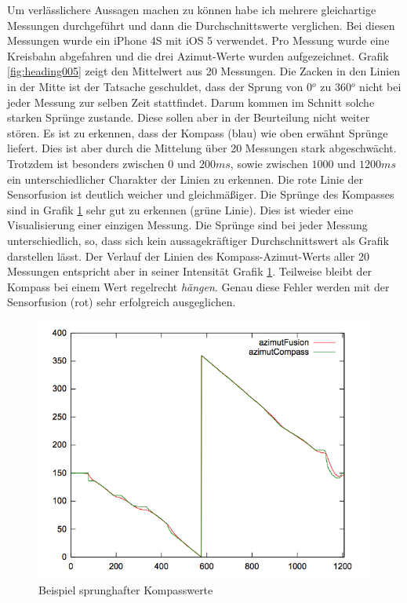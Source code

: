 Um verlässlichere Aussagen machen zu können habe ich mehrere gleichartige Messungen durchgeführt und dann die Durchschnittswerte verglichen. Bei diesen Messungen wurde ein iPhone 4S mit iOS 5 verwendet. Pro Messung wurde eine Kreisbahn abgefahren und die drei Azimut-Werte wurden aufgezeichnet. Grafik \ref{fig:heading005} zeigt den Mittelwert aus 20 Messungen. Die Zacken in den Linien in der Mitte ist der Tatsache geschuldet, dass der Sprung von 0$^o$ zu 360$^o$ nicht bei jeder Messung zur selben Zeit stattfindet. Darum kommen im Schnitt solche starken Sprünge zustande. Diese sollen aber in der Beurteilung nicht weiter stören. Es ist zu erkennen, dass der Kompass (blau) wie oben erwähnt Sprünge liefert. Dies ist aber durch die Mittelung über 20 Messungen stark abgeschwächt. Trotzdem ist besonders zwischen $0$ und $200ms$, sowie zwischen $1000$ und $1200ms$ ein unterschiedlicher Charakter der Linien zu erkennen. Die rote Linie der Sensorfusion ist deutlich weicher und gleichmäßiger. Die Sprünge des Kompasses sind in Grafik \ref{fig:heading006} sehr gut zu erkennen (grüne Linie). Dies ist wieder eine Visualisierung einer einzigen Messung. Die Sprünge sind bei jeder Messung unterschiedlich, so, dass sich kein aussagekräftiger Durchschnittswert als Grafik darstellen lässt. Der Verlauf der Linien des Kompass-Azimut-Werts aller 20 Messungen entspricht aber in seiner Intensität Grafik \ref{fig:heading006}. Teilweise bleibt der Kompass bei einem Wert regelrecht \emph{hängen}. Genau diese Fehler werden mit der Sensorfusion (rot) sehr erfolgreich ausgeglichen.

\begin{figure}[htb]
\centering
\includegraphics[width=\textwidth]{figures/heading006}
\caption{Beispiel sprunghafter Kompasswerte}
\label{fig:heading006}
\end{figure}


